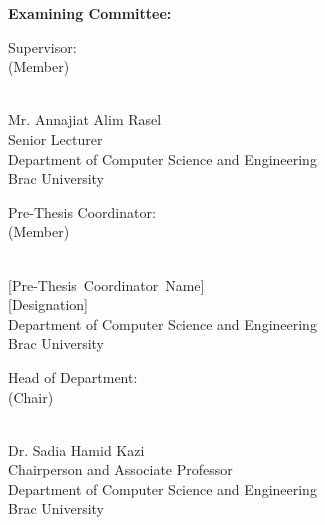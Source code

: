 \documentclass[11pt,a4paper]{article}
\begin{document}
\vspace{1cm}

\textbf{Examining Committee:}

\vspace{1.5cm}

\begin{flushleft}
Supervisor:\\
(Member)
\end{flushleft}

\begin{flushright}
\vspace{-0.5cm}
\hrulefill\\
Mr. Annajiat Alim Rasel\\
Senior Lecturer\\
Department of Computer Science and Engineering\\
Brac University
\end{flushright}

\vspace{1.5cm}

\begin{flushleft}
Pre-Thesis Coordinator:\\
(Member)
\end{flushleft}

\begin{flushright}
\vspace{-0.5cm}
\hrulefill\\
\mbox{[Pre-Thesis Coordinator Name]}\\
\mbox{[Designation]}\\
Department of Computer Science and Engineering\\
Brac University
\end{flushright}

\vspace{1.5cm}

\begin{flushleft}
Head of Department:\\
(Chair)
\end{flushleft}

\begin{flushright}
\vspace{-0.5cm}
\hrulefill\\
Dr. Sadia Hamid Kazi\\
Chairperson and Associate Professor\\
Department of Computer Science and Engineering\\
Brac University
\end{flushright}
\end{document}
